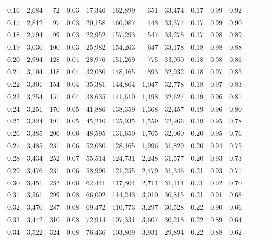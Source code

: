 \begin{tabular}{rrrrrrrrrrrrrr}
0.16 &  2,684 &   72 &  0.03 &   17,346 &  162,899 &     351 &  33,474 &  0.17 &  0.99 &      0.92 \\
0.17 &  2,812 &   97 &  0.03 &   20,158 &  160,087 &     448 &  33,377 &  0.17 &  0.99 &      0.90 \\
0.18 &  2,794 &   99 &  0.03 &   22,952 &  157,293 &     547 &  33,278 &  0.17 &  0.98 &      0.89 \\
0.19 &  3,030 &  100 &  0.03 &   25,982 &  154,263 &     647 &  33,178 &  0.18 &  0.98 &      0.88 \\
0.20 &  2,994 &  128 &  0.04 &   28,976 &  151,269 &     775 &  33,050 &  0.18 &  0.98 &      0.86 \\
0.21 &  3,104 &  118 &  0.04 &   32,080 &  148,165 &     893 &  32,932 &  0.18 &  0.97 &      0.85 \\
0.22 &  3,301 &  154 &  0.04 &   35,381 &  144,864 &   1,047 &  32,778 &  0.18 &  0.97 &      0.83 \\
0.23 &  3,254 &  151 &  0.04 &   38,635 &  141,610 &   1,198 &  32,627 &  0.19 &  0.96 &      0.81 \\
0.24 &  3,251 &  170 &  0.05 &   41,886 &  138,359 &   1,368 &  32,457 &  0.19 &  0.96 &      0.80 \\
0.25 &  3,324 &  191 &  0.05 &   45,210 &  135,035 &   1,559 &  32,266 &  0.19 &  0.95 &      0.78 \\
0.26 &  3,385 &  206 &  0.06 &   48,595 &  131,650 &   1,765 &  32,060 &  0.20 &  0.95 &      0.76 \\
0.27 &  3,485 &  231 &  0.06 &   52,080 &  128,165 &   1,996 &  31,829 &  0.20 &  0.94 &      0.75 \\
0.28 &  3,434 &  252 &  0.07 &   55,514 &  124,731 &   2,248 &  31,577 &  0.20 &  0.93 &      0.73 \\
0.29 &  3,476 &  231 &  0.06 &   58,990 &  121,255 &   2,479 &  31,346 &  0.21 &  0.93 &      0.71 \\
0.30 &  3,451 &  232 &  0.06 &   62,441 &  117,804 &   2,711 &  31,114 &  0.21 &  0.92 &      0.70 \\
0.31 &  3,561 &  299 &  0.08 &   66,002 &  114,243 &   3,010 &  30,815 &  0.21 &  0.91 &      0.68 \\
0.32 &  3,470 &  287 &  0.08 &   69,472 &  110,773 &   3,297 &  30,528 &  0.22 &  0.90 &      0.66 \\
0.33 &  3,442 &  310 &  0.08 &   72,914 &  107,331 &   3,607 &  30,218 &  0.22 &  0.89 &      0.64 \\
0.34 &  3,522 &  324 &  0.08 &   76,436 &  103,809 &   3,931 &  29,894 &  0.22 &  0.88 &      0.62 \\

\end{tabular}
